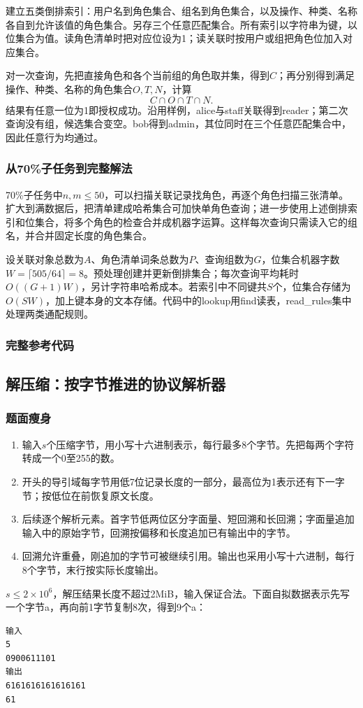 建立五类倒排索引：用户名到角色集合、组名到角色集合，以及操作、种类、名称各自到允许该值的角色集合。另存三个任意匹配集合。所有索引以字符串为键，以位集合为值。读角色清单时把对应位设为1；读关联时按用户或组把角色位加入对应集合。

对一次查询，先把直接角色和各个当前组的角色取并集，得到$C$；再分别得到满足操作、种类、名称的角色集合$O,T,N$，计算
\[
C\cap O\cap T\cap N.
\]
结果有任意一位为1即授权成功。沿用样例，alice与staff关联得到reader；第二次查询没有组，候选集合变空。bob得到admin，其位同时在三个任意匹配集合中，因此任意行为均通过。

\subsubsection{从70\%子任务到完整解法}
70\%子任务中$n,m\le50$，可以扫描关联记录找角色，再逐个角色扫描三张清单。扩大到满数据后，把清单建成哈希集合可加快单角色查询；进一步使用上述倒排索引和位集合，将多个角色的检查合并成机器字运算。这样每次查询只需读入它的组名，并合并固定长度的角色集合。

设关联对象总数为$A$、角色清单词条总数为$P$、查询组数为$G$，位集合机器字数$W=\lceil505/64\rceil=8$。预处理创建并更新倒排集合；每次查询平均耗时$O((G+1)W)$，另计字符串哈希成本。若索引中不同键共$S$个，位集合存储为$O(SW)$，加上键本身的文本存储。代码中的lookup用find读表，read\_rules集中处理两类通配规则。

\subsubsection{完整参考代码}

\subsection{解压缩：按字节推进的协议解析器}
\subsubsection{题面瘦身}
\begin{enumerate}
\item 输入$s$个压缩字节，用小写十六进制表示，每行最多8个字节。先把每两个字符转成一个0至255的数。
\item 开头的导引域每字节用低7位记录长度的一部分，最高位为1表示还有下一字节；按低位在前恢复原文长度。
\item 后续逐个解析元素。首字节低两位区分字面量、短回溯和长回溯；字面量追加输入中的原始字节，回溯按偏移和长度追加已有输出中的字节。
\item 回溯允许重叠，刚追加的字节可被继续引用。输出也采用小写十六进制，每行8个字节，末行按实际长度输出。
\end{enumerate}
$s\le2\times10^6$，解压结果长度不超过2MiB，输入保证合法。下面自拟数据表示先写一个字节a，再向前1字节复制8次，得到9个a：
\begin{verbatim}
输入
5
0900611101
输出
6161616161616161
61
\end{verbatim}

